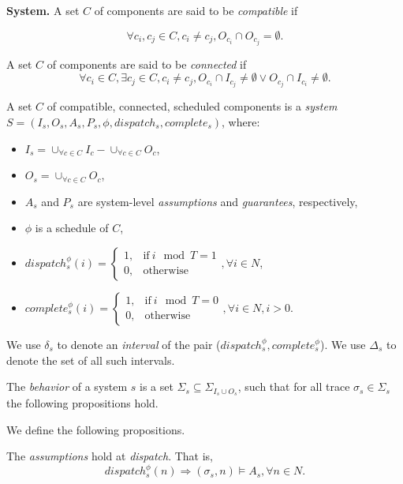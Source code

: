 {\bf System.}
A set $C$ of components are said to be \emph{compatible} if 

\begin{equation*}
\forall c_i,c_j \in C, c_i\neq c_j, O_{c_i} \cap O_{c_j} = \emptyset.
\end{equation*}

A set $C$ of components are said to be \emph{connected} if
\begin{equation*}
\forall c_i \in C, \exists c_j \in C, c_i\neq c_j, O_{c_i} \cap I_{c_j} \neq \emptyset \vee O_{c_j} \cap I_{c_i} \neq \emptyset.
\end{equation*}

A set $C$ of compatible, connected, scheduled components is a \emph{system} $S = (I_s, O_s, A_s, P_s, \phi, dispatch_s, complete_s)$, where:
\begin{itemize}
	\item $I_s = \cup_{\forall c \in C}I_c -  \cup_{\forall c \in C}O_c$,
	\item $O_s = \cup_{\forall c \in C}O_c$,
	\item $A_s$ and $P_s$ are system-level \emph{assumptions} and \emph{guarantees}, respectively,
	\item $\phi$ is a schedule of $C$,	
	\item $dispatch_s^\phi (i) = 
	    	\begin{cases}
      		1, & \text{if}\ i \mod T =1 \\
	     	0, & \text{otherwise}
   	 	\end{cases}, \forall i \in N$,
   	\item $complete_s^\phi (i) =
   		\begin{cases}
      		1, & \text{if}\ i \mod T = 0 \\
	     	0, & \text{otherwise}
   	 	\end{cases}, \forall i \in N, i > 0$.
\end{itemize}

We use $\delta_s$ to denote an \emph{interval} of the pair ($dispatch_s^\phi, complete_s^\phi$). We use $\Delta_s$ to denote the set of all such intervals.

The \emph{behavior} of a system $s$ is a set $\Sigma_s \subseteq \Sigma_{I_s \cup O_s}$, such that for all trace $\sigma_s \in \Sigma_s$ the following propositions hold.

We define the following propositions.

The \emph{assumptions} hold at \emph{dispatch}. That is,
\begin{equation} 
\label{eqn:assumption}
dispatch_s^\phi(n) \Rightarrow (\sigma_s, n) \models A_s, \forall n\in N.
\end{equation}

